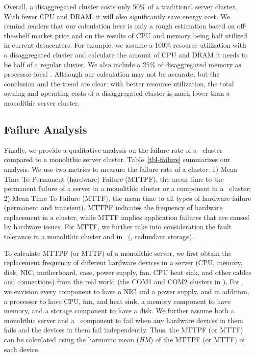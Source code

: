 \documentclass[10pt,times,twocolumn]{z2-article}
\begin{document}
{{{{{{{Overall, a disaggregated cluster costs only 50\% of a traditional server cluster.
With fewer CPU and DRAM, it will also significantly save energy cost.
We remind readers that our calculation here is only a rough estimation based on off-the-shelf market price
and on the results of CPU and memory being half utilized in current datacenters.
For example, we assume a 100\% resource utilization with a disaggregated cluster
and calculate the amount of CPU and DRAM it needs to be half of a regular cluster.
We also include a 25\% of disaggregated memory as processor-local \excache.
Although our calculation may not be accurate, but the conclusion and the trend are clear:
with better resource utilization, the total owning and operating costs of a disaggregated cluster is much lower than a monolithic server cluster. 
\fi

\subsection{Failure Analysis}
\label{sec:failure-results}
Finally, we provide a qualitative analysis on the failure rate of a \lego\ cluster compared to a monolithic server cluster.
Table~\ref{tbl-failure} summarizes our analysis.
We use two metrics to measure the failure rate of a cluster: 
1) Mean Time To Permanent (hardware) Failure (MTTPF), the mean time to the permanent failure of a server in a monolithic cluster
or a component in a \lego\ cluster;
2) Mean Time To Failure (MTTF), the mean time to all types of hardware failure (permanent and transient).
MTTPF indicates the frequency of hardware replacement in a cluster, 
while MTTF implies application failures that are caused by hardware issues.
For MTTF, we further take into consideration the fault tolerance in a monolithic cluster and in \lego\ (\eg, redundant storage).

To calculate MTTPF (or MTTF) of a monolithic server, we first obtain the replacement frequency of different hardware devices in a server
(CPU, memory, disk, NIC, motherboard, case, power supply, fan, CPU heat sink, and other cables and connections)
from the real world (the COM1 and COM2 clusters in \cite{Failure-Disk-FAST07}).
For \lego, we envision every component to have a NIC and a power supply, 
and in addition, a processor to have CPU, fan, and heat sink, a memory component to have memory, and a storage component to have a disk.
We further assume both a monolithic server and a \lego\ component to fail when any hardware devices in them fails
and the devices in them fail independently.
Thus, the MTTPF (or MTTF) can be calculated using the harmonic mean ({\em HM}) 
of the MTTPF (or MTTF) of each device.

}}}}}}}
\end{document}

